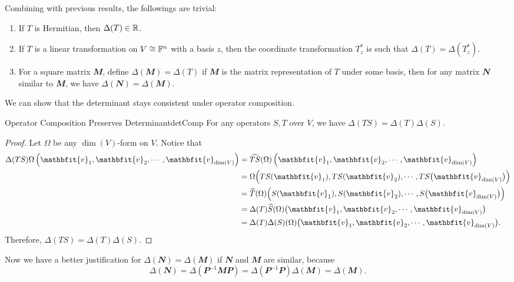 \documentclass[math, code]{amznotes}
\theoremstyle{remark}
\begin{document}
Combining with previous results, the followings are trivial:
\begin{enumerate}
    \item If $T$ is Hermitian, then $\Delta(T) \in \mathbb{R}$.
    \item If $T$ is a linear transformation on $V \cong \mathbb{F}^n$ with a basis $z$, then the coordinate transformation $T^*_z$ is such that $\Delta(T) = \Delta\left(T^*_z\right)$.
    \item For a square matrix $\mathbfit{M}$, define $\Delta(\mathbfit{M}) = \Delta(T)$ if $\mathbfit{M}$ is the matrix representation of $T$ under some basis, then for any matrix $\mathbfit{N}$ similar to $\mathbfit{M}$, we have $\Delta(\mathbfit{N}) = \Delta(\mathbfit{M})$.
\end{enumerate}
We can show that the determinant stays consistent under operator composition.
\begin{probox}{Operator Composition Preserves Determinant}{detComp}
    For any operators $S, T$ over $V$, we have $\Delta(TS) = \Delta(T)\Delta(S)$.
    \tcblower
    \begin{proof}
        Let $\Omega$ be any $\dim(V)$-form on $V$. Notice that 
        \begin{align*}
            \Delta(TS)\Omega\left(\mathbfit{v}_1, \mathbfit{v}_2, \cdots, \mathbfit{v}_{\dim(V)}\right) & = \widehat{TS}(\Omega)\left(\mathbfit{v}_1, \mathbfit{v}_2, \cdots, \mathbfit{v}_{\dim(V)}\right) \\
            & = \Omega\Bigl(TS(\mathbfit{v}_1), TS(\mathbfit{v}_2), \cdots, TS\bigl(\mathbfit{v}_{\dim(V)}\bigr)\Bigr) \\
            & = \widehat{T}(\Omega)\Bigl(S(\mathbfit{v}_1), S(\mathbfit{v}_2), \cdots, S\bigl(\mathbfit{v}_{\dim(V)}\bigr)\Bigr) \\
            & = \Delta(T)\widehat{S}(\Omega)\bigl(\mathbfit{v}_1, \mathbfit{v}_2, \cdots, \mathbfit{v}_{\dim(V)}\bigr) \\
            & = \Delta(T)\Delta(S)(\Omega)\bigl(\mathbfit{v}_1, \mathbfit{v}_2, \cdots, \mathbfit{v}_{\dim(V)}\bigr).
        \end{align*}
        Therefore, $\Delta(TS) = \Delta(T)\Delta(S)$.
    \end{proof}
\end{probox}
Now we have a better justification for $\Delta(\mathbfit{N}) = \Delta(\mathbfit{M})$ if $\mathbfit{N}$ and $\mathbfit{M}$ are similar, because 
\begin{equation*}
    \Delta(\mathbfit{N}) = \Delta\left(\mathbfit{P}^{-1}\mathbfit{M}\mathbfit{P}\right) = \Delta\left(\mathbfit{P}^{-1}\mathbfit{P}\right)\Delta(\mathbfit{M}) = \Delta(\mathbfit{M}).
\end{equation*}
\end{document}

